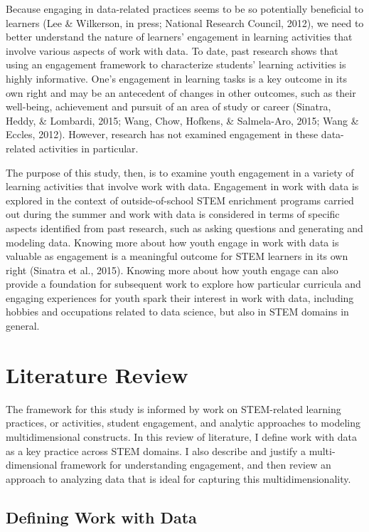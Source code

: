 \documentclass[]{book}
\theoremstyle{definition}
\theoremstyle{definition}
\theoremstyle{definition}
\theoremstyle{remark}
\begin{document}
Because engaging in data-related practices seems to be so potentially
beneficial to learners (Lee \& Wilkerson, in press; National Research
Council, 2012), we need to better understand the nature of learners'
engagement in learning activities that involve various aspects of work
with data. To date, past research shows that using an engagement
framework to characterize students' learning activities is highly
informative. One's engagement in learning tasks is a key outcome in its
own right and may be an antecedent of changes in other outcomes, such as
their well-being, achievement and pursuit of an area of study or career
(Sinatra, Heddy, \& Lombardi, 2015; Wang, Chow, Hofkens, \& Salmela-Aro,
2015; Wang \& Eccles, 2012). However, research has not examined
engagement in these data-related activities in particular.

The purpose of this study, then, is to examine youth engagement in a
variety of learning activities that involve work with data. Engagement
in work with data is explored in the context of outside-of-school STEM
enrichment programs carried out during the summer and work with data is
considered in terms of specific aspects identified from past research,
such as asking questions and generating and modeling data. Knowing more
about how youth engage in work with data is valuable as engagement is a
meaningful outcome for STEM learners in its own right (Sinatra et al.,
2015). Knowing more about how youth engage can also provide a foundation
for subsequent work to explore how particular curricula and engaging
experiences for youth spark their interest in work with data, including
hobbies and occupations related to data science, but also in STEM
domains in general.

\chapter{Literature Review}\label{literature-review}

The framework for this study is informed by work on STEM-related
learning practices, or activities, student engagement, and analytic
approaches to modeling multidimensional constructs. In this review of
literature, I define work with data as a key practice across STEM
domains. I also describe and justify a multi-dimensional framework for
understanding engagement, and then review an approach to analyzing data
that is ideal for capturing this multidimensionality.

\section{Defining Work with Data}\label{defining-work-with-data}
\end{document}
